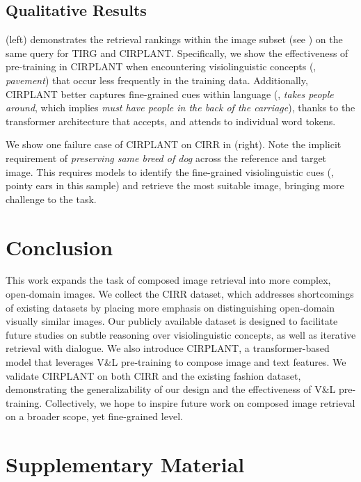 \documentclass[10pt,twocolumn,letterpaper]{article}
\newcommand{\dstname}{CIRR\xspace}
\newcommand{\modelname}{CIRPLANT\xspace}
\begin{document}
\subsection{Qualitative Results}\label{sec:quali}
 (left) demonstrates the retrieval rankings within the image subset (see ) on the same query for TIRG and \modelname. Specifically, we show the effectiveness of pre-training in \modelname when encountering visiolinguistic concepts (\ie, \textit{pavement}) that occur less frequently in the training data. Additionally, \modelname better captures fine-grained cues within language (\eg, \textit{takes people around}, which implies \textit{must have people in the back of the carriage}), thanks to the transformer architecture that accepts, and attends to individual word tokens.

We show one failure case of \modelname on \dstname in  (right). Note the implicit requirement of \textit{preserving same breed of dog} across the reference and target image. This requires models to identify the fine-grained visiolinguistic cues (\ie, pointy ears in this sample) and retrieve the most suitable image, bringing more challenge to the task. 

\section{Conclusion}
This work expands the task of composed image retrieval into more complex, open-domain images. We collect the \dstname dataset, which addresses shortcomings of existing datasets by placing more emphasis on distinguishing open-domain visually similar images.
Our publicly available dataset is designed to facilitate future studies on subtle reasoning over visiolinguistic concepts, as well as iterative retrieval with dialogue.
We also introduce \modelname, a transformer-based model that leverages V\&L pre-training to compose image and text features. We validate \modelname on both \dstname and the existing fashion dataset, demonstrating the generalizability of our design and the effectiveness of V\&L pre-training.
Collectively, we hope to inspire future work on composed image retrieval on a broader scope, yet fine-grained level.

{\small


}

\clearpage
\appendix
\section*{Supplementary Material}
\end{document}
